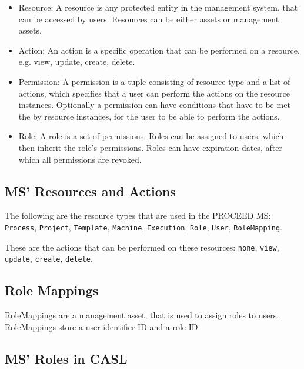 \begin{itemize}
	\item Resource: A resource is any protected entity in the management system, that can be
	      accessed by users. Resources can be either assets or management assets.
	\item Action: An action is a specific operation that can be performed on a resource, e.g. view, update, create, delete.
	\item Permission: A permission is a tuple consisting of resource type and a list of
        actions, which specifies that a user can perform the actions on the resource instances.
        Optionally a permission can have conditions that have to be met the by resource instances,
        for the user to be able to perform the actions.
	\item Role: A role is a set of permissions. Roles can be assigned to users, which then
	      inherit the role's permissions. Roles can have expiration dates, after which all
	      permissions are revoked.
\end{itemize}

\subsection{MS' Resources and Actions}
\label{cha:relatedwork:proceedroles:ms-resources-actions}

The following are the resource types that are used in the PROCEED MS:
\lstinline{Process},
\lstinline{Project},
\lstinline{Template},
\lstinline{Machine},
\lstinline{Execution},
\lstinline{Role},
\lstinline{User},
\lstinline{RoleMapping}.

These are the actions that can be performed on these resources:
\lstinline{none},
\lstinline{view},
\lstinline{update},
\lstinline{create},
\lstinline[keywords={}]{delete}.

\subsection{Role Mappings}
\label{cha:relatedwork:proceedroles:role-mappings}

RoleMappings are a management asset, that is used to assign roles to users.
RoleMappings store a user identifier ID and a role ID.

\subsection{MS' Roles in CASL}
\label{cha:relatedwork:proceedroles:casl}

